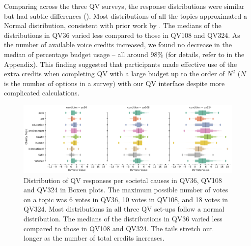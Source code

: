 Comparing across the three QV surveys, the response distributions were similar but had subtle differences (). Most distributions of all the topics approximated a Normal distribution, consistent with prior work by \textcite{quarfoot2017quadratic}. The medians of the distributions in QV36 varied less compared to those in QV108 and QV324. As the number of available voice credits increased, we found no decrease in the median of percentage budget usage -- all around 98\% (for details, refer to  in the Appendix). This finding suggested that participants made effective use of the extra credits when completing QV with a large budget up to the order of $N^2$ ($N$ is the number of options in a survey) with our QV interface despite more complicated calculations. 


\begin{figure}[htpb]
    \centering
    \includegraphics[width=\textwidth, keepaspectratio=true]{content/image/qv_distribution_per_topic.pdf}
    \caption{
      Distribution of QV responses per societal causes in QV36, QV108 and QV324 in Boxen plots. The maximum possible number of votes on a topic was 6 votes in QV36, 10 votes in QV108, and 18 votes in QV324. Most distributions in all three QV set-ups follow a normal distribution. The medians of the distributions in QV36 varied less compared to those in QV108 and QV324. The tails stretch out longer as the number of total credits increases. 
    }
    \label{fig:qv3_exp1}
\end{figure}

